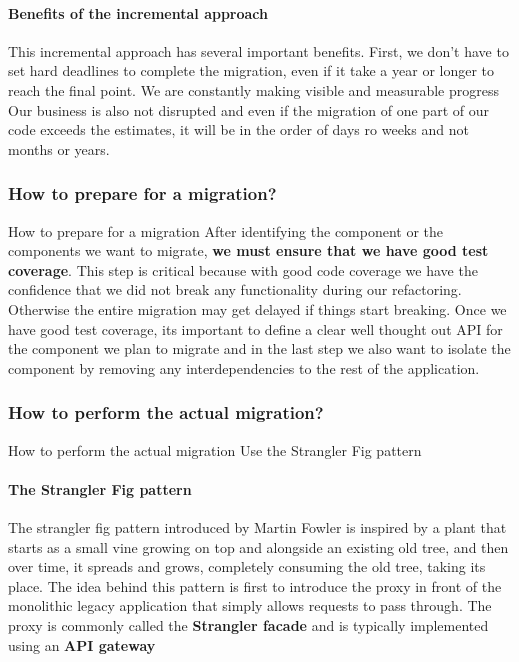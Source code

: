 \paragraph{Benefits of the incremental approach}
This incremental approach has several important benefits.
First, we don't have to set hard deadlines to complete the migration, even if it take a year or longer to reach the final point.
We are constantly making visible and measurable progress
Our business is also not disrupted and even if the migration of one part of our code exceeds the estimates, it will be in the order of days ro weeks and not months or years.

\subsubsection{How to prepare for a migration?}
How to prepare for a migration
After identifying the component or the components we want to migrate, \textbf{we must ensure that we have good test coverage}.
This step is critical because with good code coverage we have the confidence that we did not break any functionality during our refactoring.
Otherwise the entire migration may get delayed if things start breaking.
Once we have good test coverage, its important to define a clear well thought out API for the component we plan to migrate and in the last step we also want to isolate the component by removing any interdependencies to the rest of the application.

\subsubsection{How to perform the actual migration?}
How to perform the actual migration
Use the Strangler Fig pattern

\paragraph{The Strangler Fig pattern}
The strangler fig pattern introduced by Martin Fowler is inspired by a plant that starts as a small vine growing on top and alongside an existing old tree, and then over time, it spreads and grows, completely consuming the old tree, taking its place.
The idea behind this pattern is first to introduce the proxy in front of the monolithic legacy application that simply allows requests to pass through.
The proxy is commonly called the \textbf{Strangler facade} and is typically implemented using an \textbf{API gateway}

